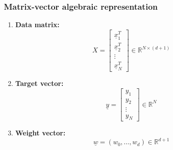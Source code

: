     \subsubsection{Matrix-vector algebraic representation}
    \begin{definition}
        \begin{enumerate}
            \item \textbf{Data matrix:} \[
                                        X = 
                                        \begin{bmatrix}
                                            \underline{x}_1^T \\
                                            \underline{x}_2^T \\
                                            \vdots \\
                                            \underline{x}_N^T
                                        \end{bmatrix} \in \mathbb{R}^{N \times (d+1)}
                                        \] 
            \item \textbf{Target vector:} \[
                                        \underline{y} = 
                                        \begin{bmatrix}
                                            y_1 \\
                                            y_2 \\
                                            \vdots \\
                                            y_N
                                        \end{bmatrix} \in \mathbb{R}^{N}
                                        \]
            \item \textbf{Weight vector:} 
            \[
            \underline{w} = (w_0, \dots, w_d) \in \mathbb{R}^{d+1}
            \]
        

\end{enumerate}
\end{definition}
